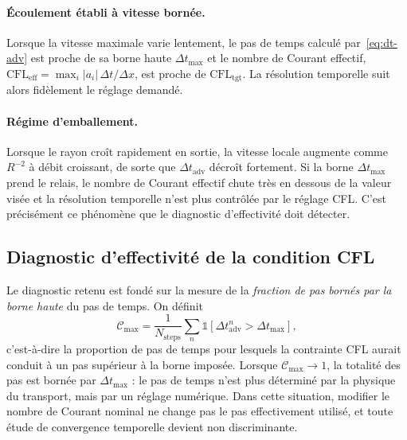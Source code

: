 \documentclass[11pt,a4paper]{report}
\newcommand{\dt}{\Delta t}
\begin{document}
\paragraph{Écoulement établi à vitesse bornée.} Lorsque la vitesse maximale varie lentement, le pas de
temps calculé par~\eqref{eq:dt-adv} est proche de sa borne haute \(\dt_{\max}\) et le nombre de Courant
effectif, \(\mathrm{CFL}_{\mathrm{eff}} = \max_i|a_i|\,\dt/\Delta x\), est proche de
\(\mathrm{CFL}_{\mathrm{tgt}}\). La résolution temporelle suit alors fidèlement le réglage demandé.

\paragraph{Régime d'emballement.} Lorsque le rayon croît rapidement en sortie, la vitesse locale augmente
comme \(R^{-2}\) à débit croissant, de sorte que \(\dt_{\mathrm{adv}}\) décroît fortement. Si la borne
\(\dt_{\max}\) prend le relais, le nombre de Courant effectif chute très en dessous de la valeur visée et
la résolution temporelle n'est plus contrôlée par le réglage CFL. C'est précisément ce phénomène que
le diagnostic d'effectivité doit détecter.

\subsection{Diagnostic d'effectivité de la condition CFL}
\label{sec:cfl-diagnostic}

Le diagnostic retenu est fondé sur la mesure de la \emph{fraction de pas bornés par la borne haute} du pas
de temps. On définit
\begin{equation}
\mathcal{C}_{\max} = \frac{1}{N_{\mathrm{steps}}}
\sum_{n} \mathbb{1}\left[\dt_{\mathrm{adv}}^n > \dt_{\max}\right],
\label{eq:clipping}
\end{equation}
c'est-à-dire la proportion de pas de temps pour lesquels la contrainte CFL aurait conduit à un pas
supérieur à la borne imposée. Lorsque \(\mathcal{C}_{\max}\to 1\), la totalité des pas est bornée par
\(\dt_{\max}\) : le pas de temps n'est plus déterminé par la physique du transport, mais par un réglage
numérique. Dans cette situation, modifier le nombre de Courant nominal ne change pas le pas effectivement
utilisé, et toute étude de convergence temporelle devient non discriminante.
\end{document}
